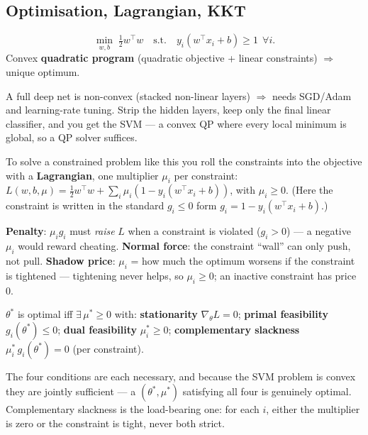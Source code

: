 \documentclass[11pt, a4paper]{article}
\newcommand{\kw}[1]{\textbf{#1}}
\begin{document}
\subsection{Optimisation, Lagrangian, KKT}

\begin{defbox}
\[
\min_{w,b}\;\tfrac12 w^\top w \quad\text{s.t.}\quad y_i(w^\top x_i+b)\ge1\ \ \forall i.
\]
Convex \kw{quadratic program} (quadratic objective + linear constraints) $\Rightarrow$ unique optimum.
\end{defbox}

\begin{notebox}
A full deep net is non-convex (stacked non-linear layers) $\Rightarrow$ needs SGD/Adam and
learning-rate tuning. Strip the hidden layers, keep only the final linear classifier, and you get the
SVM — a convex QP where every local minimum is global, so a QP solver suffices.
\end{notebox}

To solve a constrained problem like this you roll the constraints into the objective with a
\kw{Lagrangian}, one multiplier $\mu_i$ per constraint:
$L(w,b,\mu)=\tfrac12 w^\top w+\sum_i\mu_i(1-y_i(w^\top x_i+b))$, with $\mu_i\ge0$. (Here the
constraint is written in the standard $g_i\le0$ form $g_i=1-y_i(w^\top x_i+b)$.)

\begin{notebox}
\kw{Penalty}: $\mu_i g_i$ must \emph{raise} $L$ when a constraint is violated ($g_i>0$) — a negative
$\mu_i$ would reward cheating. \kw{Normal force}: the constraint ``wall'' can only push, not pull.
\kw{Shadow price}: $\mu_i$ = how much the optimum worsens if the constraint is tightened — tightening
never helps, so $\mu_i\ge0$; an inactive constraint has price $0$.
\end{notebox}

\begin{defbox}
$\theta^\ast$ is optimal iff $\exists\,\mu^\ast\ge0$ with: \kw{stationarity} $\nabla_\theta L=0$;
\kw{primal feasibility} $g_i(\theta^\ast)\le0$; \kw{dual feasibility} $\mu_i^\ast\ge0$;
\kw{complementary slackness} $\mu_i^\ast\,g_i(\theta^\ast)=0$ (per constraint).
\end{defbox}

The four conditions are each necessary, and because the SVM problem is convex they are jointly
sufficient — a $(\theta^\ast,\mu^\ast)$ satisfying all four is genuinely optimal. Complementary
slackness is the load-bearing one: for each $i$, either the multiplier is zero or the constraint is
tight, never both strict.
\end{document}
